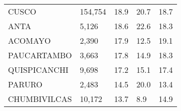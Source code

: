 \begin{tabular}{lllll}
	\cellcolor[HTML]{FF5050}CUSCO                                  & 154,754                                                               & 18.9                                                                             & 20.7                                                                        & 18.7                                                                                \\
	\cellcolor[HTML]{FF5050}ANTA                                   & 5,126                                                                 & 18.6                                                                             & 22.6                                                                        & 18.3                                                                                \\
	\cellcolor[HTML]{FF5050}ACOMAYO                                & 2,390                                                                 & 17.9                                                                             & 12.5                                                                        & 19.1                                                                                \\
	\cellcolor[HTML]{FF5050}PAUCARTAMBO                            & 3,663                                                                 & 17.8                                                                             & 14.9                                                                        & 18.3                                                                                \\
	\cellcolor[HTML]{FF5050}QUISPICANCHI                           & 9,698                                                                 & 17.2                                                                             & 15.1                                                                        & 17.4                                                                                \\
	\cellcolor[HTML]{FF5050}PARURO                                 & 2,483                                                                 & 14.5                                                                             & 20.0                                                                        & 13.4                                                                                \\
	\cellcolor[HTML]{FF5050}CHUMBIVILCAS                           & 10,172                                                                & 13.7                                                                             & 8.9                                                                         & 14.9                                                                                \\

\end{tabular}
